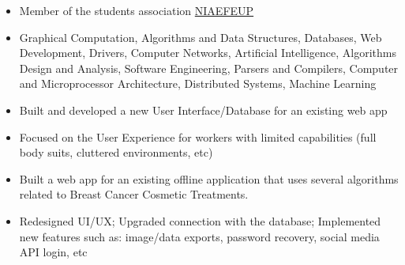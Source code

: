 \documentclass[10pt,a4paper]{altacv}
\begin{document}

\begin{fullwidth}
\makecvheader
\end{fullwidth}

\begin{itemize}
    \item Member of the students association  \href{https://ni.fe.up.pt/}{NIAEFEUP \faExternalLink}
    \item Graphical Computation, Algorithms and Data Structures, Databases, Web Development, Drivers, Computer Networks, Artificial Intelligence, Algorithms Design and Analysis, Software Engineering, Parsers and Compilers, Computer and Microprocessor Architecture, Distributed Systems, Machine Learning
\end{itemize}


\begin{itemize}
\item Built and developed a new User Interface/Database for an existing web app
\item Focused on the User Experience for workers with limited capabilities (full body suits, cluttered environments, etc)
\end{itemize}

\vspace{2mm}

\begin{itemize}
\item Built a web app for an existing offline application that uses several algorithms related to Breast Cancer Cosmetic Treatments.
\item Redesigned UI/UX; Upgraded connection with the database; Implemented new features such as: image/data exports, password recovery, social media API login, etc

\end{itemize}
\end{document}
